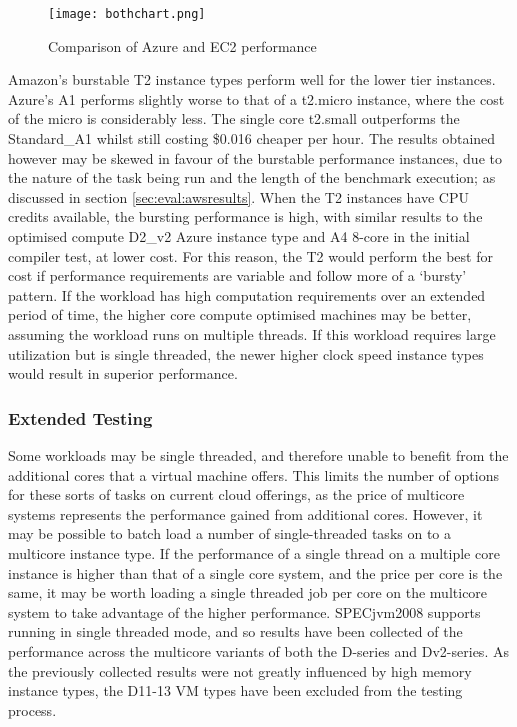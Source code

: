\documentclass{llncs}
\begin{document}
\begin{figure}[ht]
  \centering
  \texttt{[image: bothchart.png]}
  \caption{Comparison of Azure and EC2 performance}
  \label{fig:bothchart}
\end{figure}

Amazon's burstable T2 instance types perform well for the lower tier instances. Azure's A1 performs slightly worse to that of a t2.micro instance, where the cost of the micro is considerably less. The single core t2.small outperforms the Standard\_A1 whilst still costing \$0.016 cheaper per hour. The results obtained however may be skewed in favour of the burstable performance instances, due to the nature of the task being run and the length of the benchmark execution; as discussed in section \ref{sec:eval:awsresults}. When the T2 instances have CPU credits available, the bursting performance is high, with similar results to the optimised compute D2\_v2 Azure instance type and A4 8-core in the initial compiler test, at lower cost. For this reason, the T2 would perform the best for cost if performance requirements are variable and follow more of a `bursty' pattern. If the workload has high computation requirements over an extended period of time, the higher core compute optimised machines may be better, assuming the workload runs on multiple threads. If this workload requires large utilization but is single threaded, the newer higher clock speed instance types would result in superior performance.

\subsubsection{Extended Testing}\label{sec:eval:extended}

Some workloads may be single threaded, and therefore unable to benefit from the additional cores that a virtual machine offers. This limits the number of options for these sorts of tasks on current cloud offerings, as the price of multicore systems represents the performance gained from additional cores. However, it may be possible to batch load a number of single-threaded tasks on to a multicore instance type. If the performance of a single thread on a multiple core instance is higher than that of a single core system, and the price per core is the same, it may be worth loading a single threaded job per core on the multicore system to take advantage of the higher performance. SPECjvm2008 supports running in single threaded mode\cite{specjvmguide}, and so results have been collected of the performance across the multicore variants of both the D-series and Dv2-series. As the previously collected results were not greatly influenced by high memory instance types, the D11-13 VM types have been excluded from the testing process.
\end{document}
